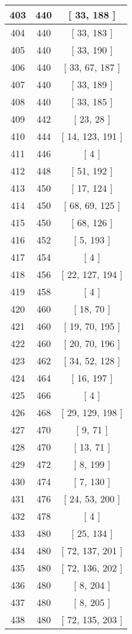 \begin{center}
\begin{longtable}[H]{|| c c c ||}
403 & 440 & [ 33, 188 ]
\\\hline
404 & 440 & [ 33, 183 ]
\\\hline
405 & 440 & [ 33, 190 ]
\\\hline
406 & 440 & [ 33, 67, 187 ]
\\\hline
407 & 440 & [ 33, 189 ]
\\\hline
408 & 440 & [ 33, 185 ]
\\\hline
409 & 442 & [ 23, 28 ]
\\\hline
410 & 444 & [ 14, 123, 191 ]
\\\hline
411 & 446 & [ 4 ]
\\\hline
412 & 448 & [ 51, 192 ]
\\\hline
413 & 450 & [ 17, 124 ]
\\\hline
414 & 450 & [ 68, 69, 125 ]
\\\hline
415 & 450 & [ 68, 126 ]
\\\hline
416 & 452 & [ 5, 193 ]
\\\hline
417 & 454 & [ 4 ]
\\\hline
418 & 456 & [ 22, 127, 194 ]
\\\hline
419 & 458 & [ 4 ]
\\\hline
420 & 460 & [ 18, 70 ]
\\\hline
421 & 460 & [ 19, 70, 195 ]
\\\hline
422 & 460 & [ 20, 70, 196 ]
\\\hline
423 & 462 & [ 34, 52, 128 ]
\\\hline
424 & 464 & [ 16, 197 ]
\\\hline
425 & 466 & [ 4 ]
\\\hline
426 & 468 & [ 29, 129, 198 ]
\\\hline
427 & 470 & [ 9, 71 ]
\\\hline
428 & 470 & [ 13, 71 ]
\\\hline
429 & 472 & [ 8, 199 ]
\\\hline
430 & 474 & [ 7, 130 ]
\\\hline
431 & 476 & [ 24, 53, 200 ]
\\\hline
432 & 478 & [ 4 ]
\\\hline
433 & 480 & [ 25, 134 ]
\\\hline
434 & 480 & [ 72, 137, 201 ]
\\\hline
435 & 480 & [ 72, 136, 202 ]
\\\hline
436 & 480 & [ 8, 204 ]
\\\hline
437 & 480 & [ 8, 205 ]
\\\hline
438 & 480 & [ 72, 135, 203 ]
\\\hline

\end{longtable}
\end{center}
